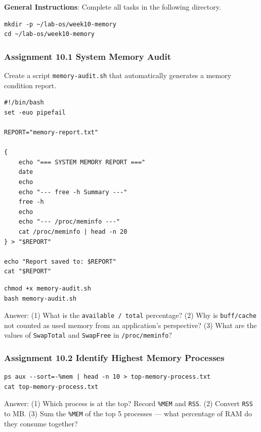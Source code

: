 \textbf{General Instructions}: Complete all tasks in the following directory.

\begin{lstlisting}[caption={Preparing the assignment directory}]
mkdir -p ~/lab-os/week10-memory
cd ~/lab-os/week10-memory
\end{lstlisting}

\subsubsection{Assignment 10.1 System Memory Audit}

Create a script \texttt{memory-audit.sh} that automatically generates a memory
condition report.

\begin{lstlisting}[caption={Contents of memory-audit.sh}]
#!/bin/bash
set -euo pipefail

REPORT="memory-report.txt"

{
    echo "=== SYSTEM MEMORY REPORT ==="
    date
    echo
    echo "--- free -h Summary ---"
    free -h
    echo
    echo "--- /proc/meminfo ---"
    cat /proc/meminfo | head -n 20
} > "$REPORT"

echo "Report saved to: $REPORT"
cat "$REPORT"
\end{lstlisting}

\begin{lstlisting}[caption={Run the audit script}]
chmod +x memory-audit.sh
bash memory-audit.sh
\end{lstlisting}

Answer: (1) What is the \texttt{available / total} percentage? (2) Why is
\texttt{buff/cache} not counted as used memory from an application's perspective?
(3) What are the values of \texttt{SwapTotal} and \texttt{SwapFree} in
\texttt{/proc/meminfo}?

\subsubsection{Assignment 10.2 Identify Highest Memory Processes}

\begin{lstlisting}[caption={Save and display the top processes}]
ps aux --sort=-%mem | head -n 10 > top-memory-process.txt
cat top-memory-process.txt
\end{lstlisting}

Answer: (1) Which process is at the top? Record \texttt{\%MEM} and \texttt{RSS}.
(2) Convert \texttt{RSS} to MB. (3) Sum the \texttt{\%MEM} of the top 5 processes
--- what percentage of RAM do they consume together?

